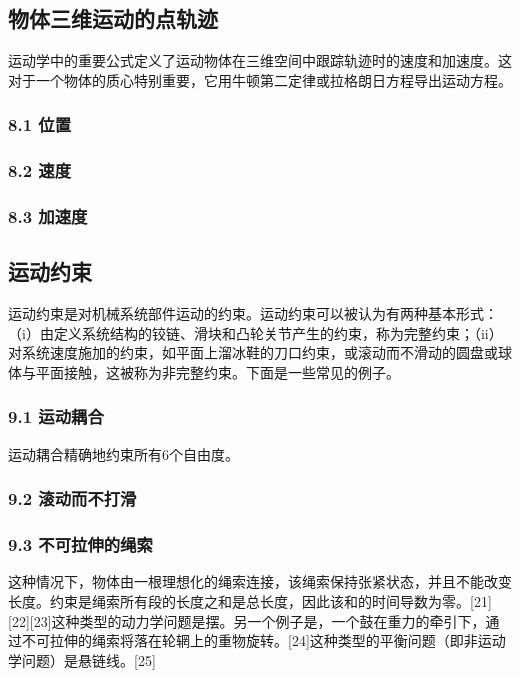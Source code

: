 \subsection{物体三维运动的点轨迹}

运动学中的重要公式定义了运动物体在三维空间中跟踪轨迹时的速度和加速度。这对于一个物体的质心特别重要，它用牛顿第二定律或拉格朗日方程导出运动方程。

\subsubsection{8.1 位置}



\subsubsection{8.2 速度}



\subsubsection{8.3 加速度}



\subsection{运动约束}

运动约束是对机械系统部件运动的约束。运动约束可以被认为有两种基本形式：（i）由定义系统结构的铰链、滑块和凸轮关节产生的约束，称为完整约束；（ii）对系统速度施加的约束，如平面上溜冰鞋的刀口约束，或滚动而不滑动的圆盘或球体与平面接触，这被称为非完整约束。下面是一些常见的例子。

\subsubsection{9.1 运动耦合}

运动耦合精确地约束所有6个自由度。

\subsubsection{9.2 滚动而不打滑}



\subsubsection{9.3 不可拉伸的绳索}

这种情况下，物体由一根理想化的绳索连接，该绳索保持张紧状态，并且不能改变长度。约束是绳索所有段的长度之和是总长度，因此该和的时间导数为零。[21][22][23]这种类型的动力学问题是摆。另一个例子是，一个鼓在重力的牵引下，通过不可拉伸的绳索将落在轮辋上的重物旋转。[24]这种类型的平衡问题（即非运动学问题）是悬链线。[25]

